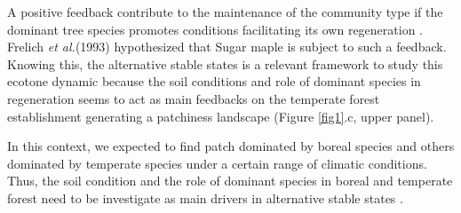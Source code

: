 A positive feedback contribute to the maintenance of the community type if the
dominant tree species promotes conditions facilitating its own regeneration
\cite{Barras1998}. Frelich \textit{et al.}(1993) \cite{Society2014}
hypothesized that Sugar maple is subject to such a feedback.  Knowing this,
the alternative stable states is a relevant framework to study this ecotone
dynamic because the soil conditions and role of dominant species in
regeneration seems to act as main feedbacks on the temperate forest
establishment generating a patchiness landscape (Figure \ref{fig1}.c, upper
panel).


In this context, we expected to find patch dominated by boreal species and
others dominated by temperate species under a certain range of climatic
conditions. Thus, the soil condition and the role of dominant species in
boreal and temperate forest need to be investigate as main drivers in
alternative stable states
\cite{Kellman2004,Moore2008,DeFrenne2013,Barras1998}.



